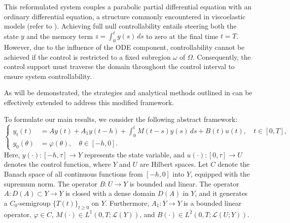 \documentclass[12pt]{article}
\theoremstyle{plain}
\theoremstyle{definition}
\begin{document}
This reformulated system couples a parabolic partial differential equation with an ordinary differential equation, a structure commonly encountered in viscoelastic models (refer to \cite{chaves2014null}). Achieving full null controllability entails steering both the state $y$ and the memory term $z = \int_0^t y(s)\,ds$ to zero at the final time $t = T$. However, due to the influence of the ODE component, controllability cannot be achieved if the control is restricted to a fixed subregion $\omega$ of $\Omega$. Consequently, the control support must traverse the domain throughout the control interval to ensure system controllability.

As will be demonstrated, the strategies and analytical methods outlined in \cite{chaves2014null,chaves2017controllability} can be effectively extended to address this modified framework.

















































To formulate our main results, we consider the following abstract framework:
\begin{equation}
\label{eq:Intro_eq_7}
\left\{
\begin{aligned}
    y_t(t) &= Ay(t) + A_1 y(t-h) + \int_0^t M(t - s)y(s)\,ds + B(t)u(t), \quad t \in [0, T], \\
    y_0(\theta) &= \varphi(\theta),\quad \theta \in [-h, 0].
\end{aligned}
\right.
\end{equation}
Here, $y(\cdot): [-h, \tau] \to Y$ represents the state variable, and $u(\cdot): [0, \tau] \to U$ denotes the control function, where $Y$ and $U$ are Hilbert spaces. Let $C$ denote the Banach space of all continuous functions from $[-h, 0]$ into $Y$, equipped with the supremum norm. The operator $B: U \to Y$ is bounded and linear. The operator $A: D(A) \subset Y \to Y$ is closed with a dense domain $D(A)$ in $Y$, and it generates a $C_0$-semigroup $\{T(t)\}_{t \geq 0}$ on $Y$. Furthermore, $A_1: Y \to Y$ is a bounded linear operator, $\varphi \in C$, $M(\cdot) \in L^1(0,T; \mathcal{L}(Y))$, and $B(\cdot) \in L^2(0,T; \mathcal{L}(U;Y))$.
\end{document}
